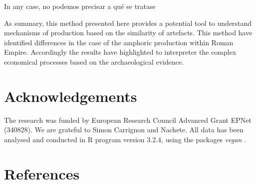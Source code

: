 \documentclass[review]{elsarticle}
\begin{document}
In any case, no podemos precisar a qué se tratase

As summary, this method presented here provides a potential tool to understand mechanisms of production based on the similarity of artefacts. This method have identified differences in the case of the amphoric production within Roman Empire. Accordingly the results have highlighted to interpreter the complex economical processes based on  the archaeological evidence. 



\section{Acknowledgements}

The research was funded by European Research Council Advanced Grant EPNet (340828). We are grateful to Simon Carrignon and Nachete. 
All data has been analysed and conducted in R program version 3.2.4, using the packages \textit{vegan} \citep{oksanen_vegan_2007}.


\section{References}


\end{document}
